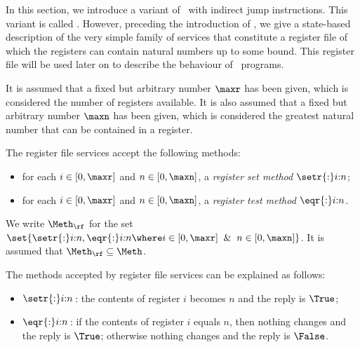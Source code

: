 \documentclass[fleqn]{llncs}
\begin{document}
In this section, we introduce a variant of \PGLD\ with indirect jump
instructions.
This variant is called \PGLDij.
However, preceding the introduction of \PGLDij, we give a state-based
description of the very simple family of services that constitute a
register file of which the registers can contain natural numbers up to
some bound.
This register file will be used later on to describe the behaviour of
\PGLDij\ programs.

It is assumed that a fixed but arbitrary number $\maxr$ has been given,
which is considered the number of registers available.
It is also assumed that a fixed but arbitrary number $\maxn$ has been
given, which is considered the greatest natural number that can be
contained in a register.

The register file services accept the following methods:
\begin{itemize}
\item
for each $i \in [0,\maxr]$ and $n \in [0,\maxn]$,
a \emph{register set method} $\setr{:}i{:}n$;
\item
for each $i \in [0,\maxr]$ and $n \in [0,\maxn]$,
a \emph{register test method} $\eqr{:}i{:}n$.
\end{itemize}
We write $\Meth_\rf$ for the set
$\set{\setr{:}i{:}n,\eqr{:}i{:}n \where
      i \in [0,\maxr] \And n \in [0,\maxn]}$.
It is assumed that $\Meth_\rf \subseteq \Meth$.

The methods accepted by register file services can be explained as
follows:
\begin{itemize}
\item
$\setr{:}i{:}n$\,:
the contents of register $i$ becomes $n$ and the reply is $\True$;
\item
$\eqr{:}i{:}n$\,:
if the contents of register $i$ equals $n$, then nothing changes and the
reply is $\True$; otherwise nothing changes and the reply is $\False$.
\end{itemize}
\end{document}

